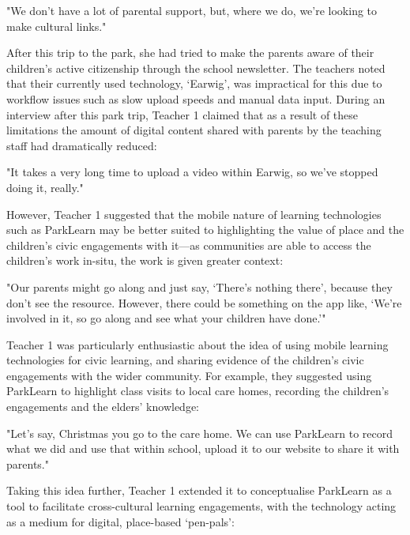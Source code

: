 \begin{displayquote}
"We don’t have a lot of parental support, but, where we do, we’re looking to make cultural links."
\end{displayquote}

After this trip to the park, she had tried to make the parents aware of their children’s active citizenship through the school newsletter. The teachers noted that their currently used technology, `Earwig', was impractical for this due to workflow issues such as slow upload speeds and manual data input. During an interview after this park trip, Teacher 1 claimed that as a result of these limitations the amount of digital content shared with parents by the teaching staff had dramatically reduced:

\begin{displayquote}
"It takes a very long time to upload a video within Earwig, so we've stopped doing it, really."
\end{displayquote}

However, Teacher 1 suggested that the mobile nature of learning technologies such as ParkLearn may be better suited to highlighting the value of place and the children’s civic engagements with it---as communities are able to access the children's work in-situ, the work is given greater context: 

\begin{displayquote}
"Our parents might go along and just say, `There's nothing there', because they don’t see the resource. However, there could be something on the app like, `We're involved in it, so go along and see what your children have done.'" 
\end{displayquote}

Teacher 1 was particularly enthusiastic about the idea of using mobile learning technologies for civic learning, and sharing evidence of the children's civic engagements with the wider community. For example, they suggested using ParkLearn to highlight class visits to local care homes, recording the children's engagements and the elders' knowledge: 

\begin{displayquote}
"Let’s say, Christmas you go to the care home. We can use ParkLearn to record what we did and use that within school, upload it to our website to share it with parents."
\end{displayquote}

Taking this idea further, Teacher 1 extended it to conceptualise ParkLearn as a tool to facilitate cross-cultural learning engagements, with the technology acting as a medium for digital, place-based `pen-pals': 


